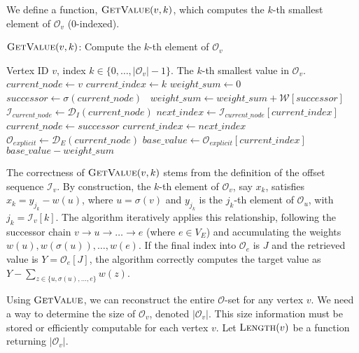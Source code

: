 We define a function, $\textsc{GetValue}(v, k)$, which computes the $k$-th smallest element of $\mathcal{O}_v$ (0-indexed).

\begin{algorithm}
    \caption{$\textsc{GetValue}(v, k)$: Compute the $k$-th element of $\mathcal{O}_v$}
    \label{alg:get_value}
    \small
    \begin{algorithmic}[1]
        \Require Vertex ID $v$, index $k \in \{0, \dots, |\mathcal{O}_v|-1\}$.
        \Ensure The $k$-th smallest value in $\mathcal{O}_v$.
        \State $current\_node \gets v$
        \State $current\_index \gets k$
        \State $weight\_sum \gets 0$
         
        \State $successor \gets \sigma(current\_node)$ \
        \State $weight\_sum \gets weight\_sum + \mathcal{W}[successor]$
        \State $\mathcal{I}_{current\_node} \gets \mathcal{D}_I(current\_node)$ 
        \State $next\_index \gets \mathcal{I}_{current\_node}[current\_index]$
        \State $current\_node \gets successor$
        \State $current\_index \gets next\_index$
        \EndWhile
        \State $\mathcal{O}_{explicit} \gets \mathcal{D}_E(current\_node)$
        \State $base\_value \gets \mathcal{O}_{explicit}[current\_index]$
        \State \Return $base\_value - weight\_sum$
    \end{algorithmic}
\end{algorithm}

The correctness of $\textsc{GetValue}(v, k)$ stems from the definition of the offset sequence $\mathcal{I}_v$. By construction, the $k$-th element of $\mathcal{O}_v$, say $x_k$, satisfies $x_k = y_{j_k} - w(u)$, where $u = \sigma(v)$ and $y_{j_k}$ is the $j_k$-th element of $\mathcal{O}_u$, with $j_k = \mathcal{I}_v[k]$. The algorithm iteratively applies this relationship, following the successor chain $v \to u \to \dots \to e$ (where $e \in V_E$) and accumulating the weights $w(u), w(\sigma(u)), \dots, w(e)$. If the final index into $\mathcal{O}_e$ is $J$ and the retrieved value is $Y = \mathcal{O}_e[J]$, the algorithm correctly computes the target value as $Y - \sum_{z \in \{u, \sigma(u), \dots, e\}} w(z)$.

Using $\textsc{GetValue}$, we can reconstruct the entire $\mathcal{O}$-set for any vertex $v$. We need a way to determine the size of $\mathcal{O}_v$, denoted $|\mathcal{O}_v|$. This size information must be stored or efficiently computable for each vertex $v$. Let $\textsc{Length}(v)$ be a function returning $|\mathcal{O}_v|$.

